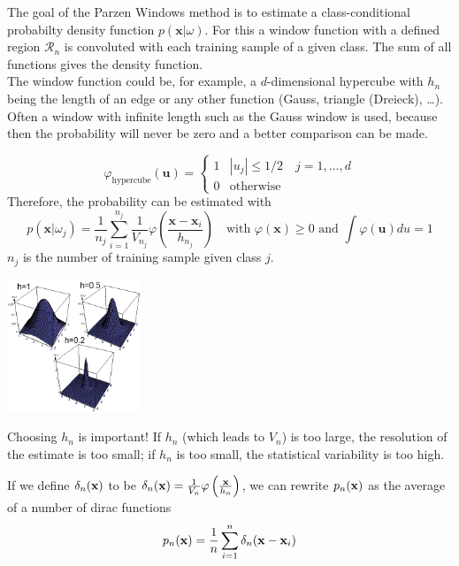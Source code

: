   	The goal of the Parzen Windows method is to estimate a class-conditional probabilty density function $p(\bm x | \omega)$. 
    For this a window function with a defined region $\mathcal{R}_n$ is convoluted with each training sample of a given class. 
    The sum of all functions gives the density function.\\
    The window function could be, for example, a $d$-dimensional hypercube with $h_n$ being the length of an edge or any other function 
    (Gauss, triangle (Dreieck), \ldots). 
    Often a window with infinite length such as the Gauss window is used, because then the probability will never be zero and a better comparison can be made.\\
    \begin{minipage}{13cm}
    	$$\varphi_{\mathrm{hypercube}}(\bm{u}) = \begin{cases}
	    1 &|u_j| \leq 1/2 \quad  j=1,\ldots,d\\
	    0 & \text{otherwise}
	    \end{cases}$$
	    Therefore, the probability can be estimated with
	    $$p(\bm{x}|\omega_j) = \frac1{n_j} \sum_{i=1}^{n_j} \frac{1}{V_{n_j}} \varphi \left(\frac{\bm{x}-\bm{x}_i}{h_{n_j}} \right) \quad 
	    \text{with } \varphi(\bm{x}) \geq 0 \text{ and } \int \varphi(\bm{u}) du = 1 $$
	    $n_j$ is the number of training sample given class $j$. \\
    \end{minipage}
    \begin{minipage}{5cm}
        \includegraphics[width=4cm]{./images/parzenWindow.png}
    \end{minipage}
    
    Choosing $h_n$ is important! If $h_n$ (which leads to $V_n$) is too large, the resolution of the
    estimate is too small; if $h_n$ is too small, the statistical variability is too high.
    
    If we define $\delta_n(\mathbf{x})$ to be $\delta_n(\mathbf{x}) = \frac{1}{V_n} \varphi\left(\frac{\mathbf{x}}{h_n}\right)$,
    we can rewrite $p_n(\mathbf{x})$ as the average of a number of dirac functions 
    \begin{equation*}
      p_n(\mathbf{x}) = \frac{1}{n}\sum\limits_{i=1}^{n}\delta_n(\mathbf{x}-\mathbf{x}_i)
    \end{equation*}
   
